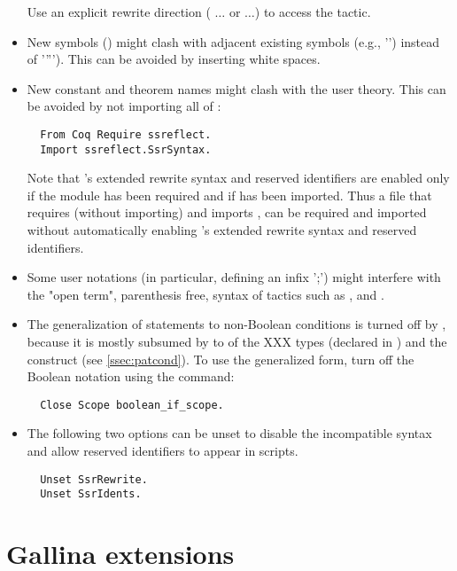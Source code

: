 \begin{itemize}
Use an explicit rewrite direction ( $\dots$ or  $\dots$)
to access the \Coq{}  tactic.
\item New symbols (\ssrC{//, /=, //=}) might clash with adjacent existing
  symbols (e.g., '\ssrC{//}') instead of '\ssrC{/}''\ssrC{/}'). This can be avoided
  by inserting white spaces.
\item New constant and theorem names might clash with the user
theory. This can be avoided by not importing all of \ssr{}:
\begin{lstlisting}
  From Coq Require ssreflect.
  Import ssreflect.SsrSyntax.
\end{lstlisting}
Note that \ssr{}'s extended rewrite syntax and reserved identifiers are
enabled only if the  module has been required and if
 has been imported. Thus a file that requires (without importing)
  and imports , can be
required and imported without automatically enabling \ssr{}'s
extended rewrite syntax and reserved identifiers.
\item Some user notations (in particular, defining an infix ';') might
interfere with the "open term", parenthesis free, syntax of tactics
such as ,  and .
\item The generalization of  statements to non-Boolean
conditions is turned off by \ssr{}, because it is mostly subsumed by
 to  of the XXX types (declared in
)
and the  {\term}    {\term}  {\term} construct (see
\ref{ssec:patcond}). To use the generalized form, turn off the \ssr{}
Boolean  notation using the command:
\begin{lstlisting}
  Close Scope boolean_if_scope.
\end{lstlisting}
\item The following two options can be unset to disable the
      incompatible  syntax and allow
      reserved identifiers to appear in scripts.
\begin{lstlisting}
  Unset SsrRewrite.
  Unset SsrIdents.
\end{lstlisting}
\end{itemize}

\section{Gallina extensions}

